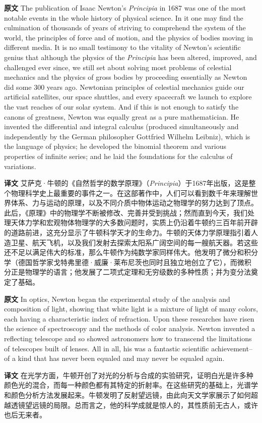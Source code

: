 \documentclass[UTF8,zihao=-4]{ctexart}
\begin{document}
\noindent\textbf{原文} The publication of Isaac Newton's \emph{Principia} in 1687 was one of the most notable events in the whole history of physical science. In it one may find the culmination of thousands of years of striving to comprehend the system of the world, the principles of force and of motion, and the physics of bodies moving in different media. It is no small testimony to the vitality of Newton's scientific genius that although the physics of the \emph{Principia} has been altered, improved, and challenged ever since, we still set about solving most problems of celestial mechanics and the physics of gross bodies by proceeding essentially as Newton did some 300 years ago. Newtonian principles of celestial mechanics guide our artificial satellites, our space shuttles, and every spacecraft we launch to explore the vast reaches of our solar system. And if this is not enough to satisfy the canons of greatness, Newton was equally great as a pure mathematician. He invented the differential and integral calculus (produced simultaneously and independently by the German philosopher Gottfried Wilhelm Leibniz), which is the language of physics; he developed the binomial theorem and various properties of infinite series; and he laid the foundations for the calculus of variations.
\par\noindent\textbf{译文} 艾萨克·牛顿的《自然哲学的数学原理》（\emph{Principia}）于1687年出版，这是整个物理科学史上最重要的事件之一。在这部著作中，人们可以看到数千年来理解世界体系、力与运动的原理，以及不同介质中物体运动之物理学的努力达到了顶点。此后，《原理》中的物理学不断被修改、完善并受到挑战；然而直到今天，我们处理天体力学和宏观物体物理学的大多数问题时，实质上仍沿着牛顿约三百年前开辟的道路前进，这充分显示了牛顿科学天才的生命力。牛顿的天体力学原理指引着人造卫星、航天飞机，以及我们发射去探索太阳系广阔空间的每一艘航天器。若这些还不足以满足伟大的标准，那么牛顿作为纯数学家同样伟大。他发明了微分和积分学（德国哲学家戈特弗里德·威廉·莱布尼茨也同时且独立地创立了它），而微积分正是物理学的语言；他发展了二项式定理和无穷级数的多种性质；并为变分法奠定了基础。
\medskip

\noindent\textbf{原文} In optics, Newton began the experimental study of the analysis and composition of light, showing that white light is a mixture of light of many colors, each having a characteristic index of refraction. Upon these researches have risen the science of spectroscopy and the methods of color analysis. Newton invented a reflecting telescope and so showed astronomers how to transcend the limitations of telescopes built of lenses. All in all, his was a fantastic scientific achievement--of a kind that has never been equaled and may never be equaled again.
\par\noindent\textbf{译文} 在光学方面，牛顿开创了对光的分析与合成的实验研究，证明白光是许多种颜色光的混合，而每一种颜色都有其特定的折射率。在这些研究的基础上，光谱学和颜色分析方法发展起来。牛顿发明了反射望远镜，由此向天文学家展示了如何超越透镜望远镜的局限。总而言之，他的科学成就是惊人的，其性质前无古人，或许也后无来者。
\medskip
\end{document}
